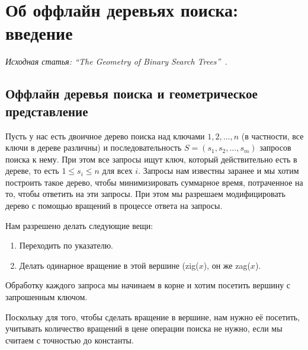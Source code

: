 \section{Об оффлайн деревьях поиска: введение}


 {\it Исходная статья: ``The Geometry of Binary Search Trees''~\cite{demaine2009geometry}.}

\subsection{Оффлайн деревья поиска и геометрическое представление}

Пусть у нас есть двоичное дерево поиска над ключами $1, 2, \ldots, n$ (в частности, все ключи в дереве различны) и последовательность $S = (s_1, s_2, \ldots, s_m)$ запросов поиска к нему. 
При этом все запросы ищут ключ, который действительно есть в дереве, то есть $1 \leqslant s_i \leqslant n$ для всех $i$. Запросы нам известны заранее и мы хотим построить такое дерево, чтобы минимизировать суммарное время, потраченное на то, чтобы ответить на эти запросы.
При этом мы разрешаем модифицировать дерево с помощью вращений в процессе
ответа на запросы.

Нам разрешено делать следующие вещи:
\begin{enumerate}
	\item Переходить по указателю.
	\item Делать одинарное вращение в этой вершине (\textrm{zig}($x$), он же \textrm{zag}($x$).
\end{enumerate}

Обработку каждого запроса мы начинаем в корне и хотим посетить вершину с запрошенным ключом.



\begin{remark}
Поскольку для того, чтобы сделать вращение в вершине, нам нужно её посетить, учитывать количество вращений в цене операции поиска не нужно, если мы считаем с точностью до константы.
\end{remark}



